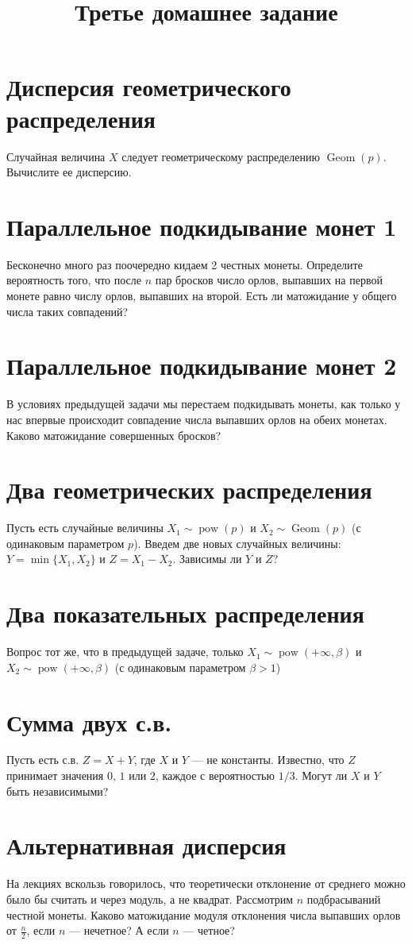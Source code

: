 \documentclass[12pt]{article}
\title{Третье домашнее задание}
\DeclareMathOperator{\Geom}{Geom}
\DeclareMathOperator{\pow}{pow}
\begin{document}
\maketitle

\section{Дисперсия геометрического распределения}

Случайная величина $X$ следует геометрическому распределению $\Geom(p)$. Вычислите ее дисперсию.

\section{Параллельное подкидывание монет 1}

Бесконечно много раз поочередно кидаем 2 честных монеты. Определите вероятность того, что после $n$ пар бросков число орлов, выпавших на первой монете равно числу орлов, выпавших на второй. Есть ли матожидание у общего числа таких совпадений?

\section{Параллельное подкидывание монет 2}
В условиях предыдущей задачи мы перестаем подкидывать монеты, как только у нас впервые происходит совпадение числа выпавших орлов на обеих монетах. Каково матожидание совершенных бросков?

\section{Два геометрических распределения}
Пусть есть случайные величины $X_1 \sim \pow(p)$ и $X_2 \sim \Geom(p)$ (с одинаковым параметром $p$). Введем две новых случайных величины: $Y = \min\{X_1, X_2\}$ и $Z = X_1 - X_2$. Зависимы ли $Y$ и $Z$?

\section{Два показательных распределения}
Вопрос тот же, что в предыдущей задаче, только $X_1 \sim \pow(+\infty, \beta)$ и $X_2 \sim \pow(+\infty, \beta)$ (с одинаковым параметром $\beta > 1$)

\section{Сумма двух с.в.}
Пусть есть с.в. $Z = X + Y$, где $X$ и $Y$ --- не константы. Известно, что $Z$ принимает значения $0$, $1$ или $2$, каждое с вероятностью $1/3$. Могут ли $X$ и $Y$ быть независимыми?

\section{Альтернативная дисперсия}
На лекциях вскользь говорилось, что теоретически отклонение от среднего можно было бы считать и через модуль, а не квадрат. Рассмотрим $n$ подбрасываний честной монеты. Каково матожидание модуля отклонения числа выпавших орлов от $\frac{n}{2}$, если $n$ --- нечетное? А если $n$ --- четное?
\end{document}
